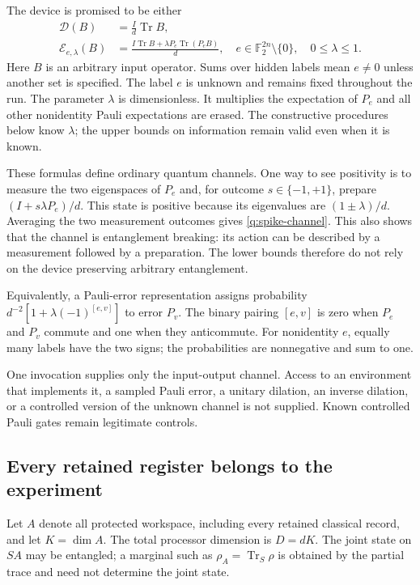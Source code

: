 \documentclass[11pt,a4paper]{article}
\numberwithin{equation}{section}
\theoremstyle{definition}
\theoremstyle{remark}
\DeclareMathOperator{\Tr}{Tr}
\begin{document}
The device is promised to be either
\begin{align}
 \mathcal D(B)&=\frac{I}{d}\Tr B, \label{q:null-channel}\\
 \mathcal E_{e,\lambda}(B)
   &=\frac{I\Tr B+\lambda P_e\Tr(P_eB)}{d},
   \quad e\in\mathbb F_2^{2n}\setminus\{0\},\quad 0\leq\lambda\leq1 .
 \label{q:spike-channel}
\end{align}
Here $B$ is an arbitrary input operator. Sums over hidden labels mean $e\ne0$
unless another set is specified. The label $e$ is unknown and remains
fixed throughout the run. The parameter $\lambda$ is dimensionless. It
multiplies the expectation of $P_e$ and all other nonidentity Pauli expectations
are erased. The constructive procedures below know $\lambda$; the upper bounds
on information remain valid even when it is known.

These formulas define ordinary quantum channels. One way to see positivity is
to measure the two eigenspaces of $P_e$ and, for outcome $s\in\{-1,+1\}$,
prepare $(I+s\lambda P_e)/d$. This state is positive because its eigenvalues
are $(1\pm\lambda)/d$. Averaging the two measurement outcomes gives
\eqref{q:spike-channel}. This also shows that the channel is entanglement
breaking: its action can be described by a measurement followed by a
preparation. The lower bounds therefore do not rely on the device preserving
arbitrary entanglement.

Equivalently, a Pauli-error representation assigns probability
$d^{-2}[1+\lambda(-1)^{[e,v]}]$ to error $P_v$. The binary pairing $[e,v]$
is zero when $P_e$ and $P_v$ commute and one when they anticommute.
For nonidentity $e$, equally many labels have the two signs; the probabilities
are nonnegative and sum to one.

One invocation supplies only the input-output channel. Access to an environment
that implements it, a sampled Pauli error, a unitary dilation, an inverse
dilation, or a controlled version of the unknown channel is not supplied.
Known controlled Pauli gates remain legitimate controls.

\subsection{Every retained register belongs to the experiment}

Let $A$ denote all protected workspace, including every retained classical
record, and let $K=\dim A$. The total processor dimension is
$D=dK$. The joint state on $SA$ may be entangled; a marginal such as
$\rho_A=\Tr_S\rho$ is obtained by the partial trace and need not determine the
joint state.
\end{document}
